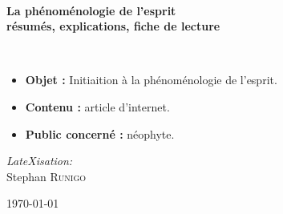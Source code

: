 \begin{titlepage}
%
~\\[1cm]

\begin{center}
\end{center}

\HRule

\begin{center}
{\huge \bfseries  La phénoménologie de l'esprit\\
\large résumés, explications, fiche de lecture\\[0.4cm] }
\end{center}

\HRule \\[1.5cm]

\begin{center}
\end{center}

\begin{center}
\end{center}

\begin{itemize}[leftmargin=1cm, label=, itemsep=2pt]
\item {\bf Objet : } Initiaition à la phénoménologie de l'esprit.
\item {\bf Contenu : } article d'internet.
\item {\bf Public concerné : } néophyte.
\end{itemize}

\begin{minipage}{0.4\textwidth}
\begin{flushleft} \large
\end{flushleft}
\end{minipage}
\begin{minipage}{0.4\textwidth}
\begin{flushright} \large
\emph{LateXisation:}\\
Stephan \textsc{Runigo}
\end{flushright}
\end{minipage}

\vfill

{\large \today}

\end{titlepage}
